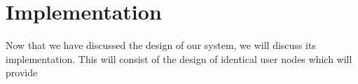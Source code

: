 \chapter{Implementation}

Now that we have discussed the design of our system, we will discuss its implementation.
This will consist of the design of identical user nodes which will provide 

